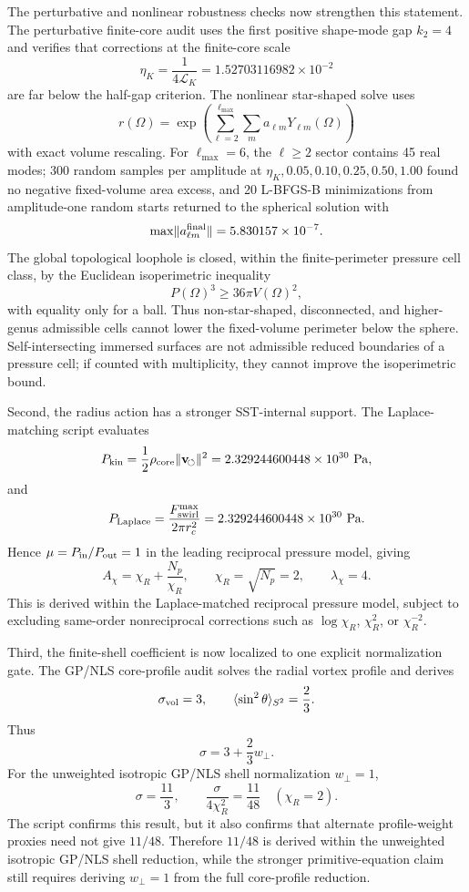 \documentclass[aps,pra,preprint,longbibliography,nofootinbib]{revtex4-2}
\begin{document}
The perturbative and nonlinear robustness checks now strengthen this statement.
The perturbative finite-core audit uses the first positive shape-mode gap
\(k_2=4\) and verifies that corrections at the finite-core scale
\[
  \eta_K=\frac{1}{4\mathcal L_K}=1.52703116982\times10^{-2}
\]
are far below the half-gap criterion.  The nonlinear star-shaped solve uses
\[
  r(\Omega)=\exp\!\left(\sum_{\ell=2}^{\ell_{\max}}\sum_m
  a_{\ell m}Y_{\ell m}(\Omega)\right)
\]
with exact volume rescaling.  For \(\ell_{\max}=6\), the
\(\ell\ge2\) sector contains 45 real modes; 300 random samples per amplitude
at \(\eta_K,0.05,0.10,0.25,0.50,1.00\) found no negative fixed-volume area
excess, and 20 L-BFGS-B minimizations from amplitude-one random starts returned
to the spherical solution with
\[
  \max\lVert a_{\ell m}^{\rm final}\rVert=5.830157\times10^{-7}.
\]
The global topological loophole is closed, within the finite-perimeter pressure
cell class, by the Euclidean isoperimetric inequality
\[
  P(\Omega)^3\ge 36\pi V(\Omega)^2,
\]
with equality only for a ball.  Thus non-star-shaped, disconnected, and
higher-genus admissible cells cannot lower the fixed-volume perimeter below the
sphere.  Self-intersecting immersed surfaces are not admissible reduced
boundaries of a pressure cell; if counted with multiplicity, they cannot
improve the isoperimetric bound.


Second, the radius action has a stronger SST-internal support.  The
Laplace-matching script evaluates
\[
  P_{\rm kin}=\frac12\rho_{\rm core}
  \lVert\mathbf v_{\!\boldsymbol{\circlearrowleft}}\rVert^2
  =
  2.329244600448\times10^{30}\ {\rm Pa},
\]
and
\[
  P_{\rm Laplace}=\frac{F_{\rm swirl}^{\max}}{2\pi r_c^2}
  =
  2.329244600448\times10^{30}\ {\rm Pa}.
\]
Hence \(\mu=P_{\rm in}/P_{\rm out}=1\) in the leading reciprocal pressure
model, giving
\[
  A_\chi=\chi_R+\frac{N_p}{\chi_R},
  \qquad
  \chi_R=\sqrt{N_p}=2,
  \qquad
  \lambda_\chi=4 .
\]
This is derived within the Laplace-matched reciprocal pressure model, subject
to excluding same-order nonreciprocal corrections such as \(\log\chi_R\),
\(\chi_R^2\), or \(\chi_R^{-2}\).

Third, the finite-shell coefficient is now localized to one explicit
normalization gate.  The GP/NLS core-profile audit solves the radial vortex
profile and derives
\[
  \sigma_{\rm vol}=3,
  \qquad
  \langle\sin^2\theta\rangle_{S^2}=\frac23.
\]
Thus
\[
  \sigma=3+\frac23 w_\perp .
\]
For the unweighted isotropic GP/NLS shell normalization \(w_\perp=1\),
\[
  \sigma=\frac{11}{3},
  \qquad
  \frac{\sigma}{4\chi_R^2}=\frac{11}{48}
  \quad(\chi_R=2).
\]
The script confirms this result, but it also confirms that alternate
profile-weight proxies need not give \(11/48\).  Therefore \(11/48\) is derived
within the unweighted isotropic GP/NLS shell reduction, while the stronger
primitive-equation claim still requires deriving \(w_\perp=1\) from the full
core-profile reduction.
\end{document}
